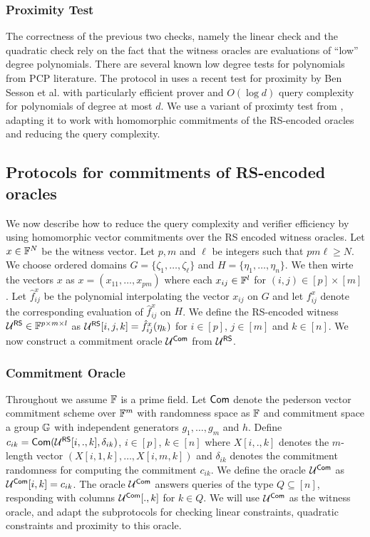\subsubsection{Proximity Test}
The correctness of the previous two checks, namely the linear check and the
quadratic check rely on the fact that the witness oracles are evaluations of
``low'' degree polynomials. There are several known low degree tests for polynomials
from PCP literature. The protocol in \cite{Aurora} uses a recent test for
proximity by Ben Sesson et al.\cite{IOPP_FRI2018} with particularly efficient
prover and $O(\log d)$ query complexity for polynomials of degree at most $d$. 
We use a variant of proximty test from \cite{Ligero2017}, adapting it to work
with homomorphic commitments of the RS-encoded oracles and reducing the query
complexity.

\subsection{Protocols for commitments of RS-encoded oracles}
We now describe how to reduce the query complexity and verifier efficiency by
using homomorphic vector commitments over the RS encoded witness oracles. Let
$x\in \mathbb{F}^N$ be the witness vector. Let $p,m$ and $\ell$ be integers such that
$pm\ell\geq N$. We choose ordered domains $G=\{\zeta_1,\ldots,\zeta_\ell\}$ and
$H=\{\eta_1,\ldots,\eta_n\}$. We then wirte the vectors $x$ as $x =
(x_{11},\ldots,x_{pm})$ where each $x_{ij}\in \mathbb{F}^l$ for $(i,j)\in [p]\times
[m]$. Let $\hat{f}^x_{ij}$ be the polynomial interpolating the vector $x_{ij}$
on $G$ and let $f^x_{ij}$ denote the corresponding evaluation of
$\hat{f}^x_{ij}$ on $H$. We define the RS-encoded witness $\mathcal{U}^{\mathsf{RS}}\in
\mathbb{F}^{p\times m\times l}$ as $\mathcal{U}^{\mathsf{RS}}[i,j,k]=\hat{f}^x_{ij}(\eta_k)$ for $i\in
[p]$, $j\in [m]$ and $k\in [n]$. We now construct a commitment oracle
$\mathcal{U}^{\mathsf{Com}}$ from $\mathcal{U}^{\mathsf{RS}}$.

\subsubsection{Commitment Oracle}
Throughout we assume $\mathbb{F}$ is a prime field. Let $\mathsf{Com}$ denote the pederson
vector commitment scheme over $\mathbb{F}^m$ with randomness space as $\mathbb{F}$ and
commitment space a group $\mathbb{G}$ with independent generators $g_1,\ldots,g_m$ and
$h$. Define $c_{ik} = \mathsf{Com}(\mathcal{U}^{\mathsf{RS}}[i,.,k],\delta_{ik})$, $i\in [p]$, $k\in
[n]$ where $X[i,.,k]$
denotes the $m$-length vector $(X[i,1,k],\ldots,X[i,m,k])$ and $\delta_{ik}$
denotes the commitment randomness for computing the commitment $c_{ik}$. We
define the oracle $\mathcal{U}^{\mathsf{Com}}$ as $\mathcal{U}^{\mathsf{Com}}[i,k]=c_{ik}$. The oracle
$\mathcal{U}^{\mathsf{Com}}$ answers queries of the type $Q\subseteq [n]$, responding with
columns $\mathcal{U}^{\mathsf{Com}}[.,k]$ for $k\in Q$. We will use $\mathcal{U}^{\mathsf{Com}}$ as the witness
oracle, and adapt the subprotocols for checking linear constraints, quadratic
constraints and proximity to this oracle.

